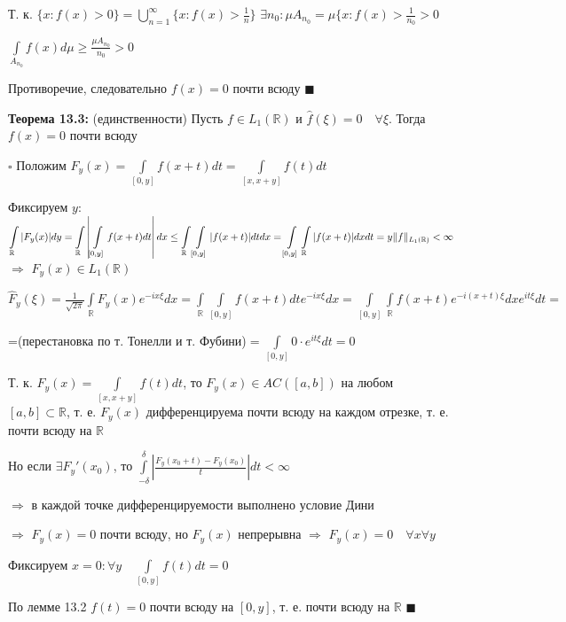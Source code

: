 \documentclass[a4paper]{report}
\newcommand*{\hm}[1]{#1\nobreak\discretionary{}%
            {\hbox{$\mathsurround=0pt #1$}}{}}
\begin{document}
Т. к. $\{x\colon f(x)>0\}=\bigcup\limits_{n=1}^\infty\{x\colon f(x)>\frac1n\}$ $\exists n_0\colon\mu A_{n_0}=\mu\{x\colon f(x)>\displaystyle\frac{1}{n_0}>0$

$\displaystyle\int\limits_{A_{n_0}}f(x)d\mu\ge\frac{\mu A_{n_0}}{n_0}>0$

Противоречие, следовательно $f(x)=0$ почти всюду $\blacksquare$
\bigskip

\noindent\textbf{Теорема 13.3:} (единственности) Пусть $f\in L_1(\mathbb R)$ и $\hat f(\xi)=0\quad\forall\xi$. Тогда $f(x)=0$ почти всюду

\noindent $\square$ Положим $F_y(x)=\displaystyle\int\limits_{[0,y]}f(x+t)dt=\displaystyle\int\limits_{[x,x+y]}f(t)dt$

Фиксируем $y$: $\displaystyle\int\limits_{\mathbb R}|F_y(x)|dy=\displaystyle\int\limits_{\mathbb R}\left|\displaystyle\int\limits_{[0,y]}f(x+t)dt\right|dx\le\displaystyle\int\limits_{\mathbb R}\displaystyle\int\limits_{[0,y]}|f(x+t)|dtdx\hm=\displaystyle\int\limits_{[0,y]}\displaystyle\int\limits_{\mathbb R}|f(x+t)|dxdt=y\|f\|_{L_1(\mathbb R)}<\infty$ $\Rightarrow$ $F_y(x)\in L_1(\mathbb R)$

$\hat F_y(\xi)=\displaystyle\frac{1}{\sqrt{2\pi}}\displaystyle\int\limits_{\mathbb R}F_y(x)e^{-ix\xi}dx=\displaystyle\int\limits_{\mathbb R}\displaystyle\int\limits_{[0,y]}f(x+t)dt e^{-ix\xi}dx=\displaystyle\int\limits_{[0,y]}\displaystyle\int\limits_{\mathbb R}f(x+t)e^{-i(x+t)\xi}dx e^{it\xi}dt=$

\noindent =(перестановка по т. Тонелли и т. Фубини)$=\displaystyle\int\limits_{[0,y]}0\cdot e^{it\xi}dt=0$

Т. к. $F_y(x)=\displaystyle\int\limits_{[x,x+y]}f(t)dt$, то $F_y(x)\in AC([a,b])$ на любом $[a,b]\subset \mathbb R$, т. е. $F_y(x)$ дифференцируема почти всюду на каждом отрезке, т. е. почти всюду на $\mathbb R$

Но если $\exists F_y'(x_0)$, то $\displaystyle\int\limits_{-\delta}^\delta\left|\frac{F_y(x_0+t)-F_y(x_0)}{t}\right|dt<\infty$

$\Rightarrow$ в каждой точке дифференцируемости выполнено условие Дини

$\Rightarrow$ $F_y(x)=0$ почти всюду, но $F_y(x)$ непрерывна $\Rightarrow$ $F_y(x)=0\quad\forall x\forall y$

Фиксируем $x=0\colon\forall y\quad\displaystyle\int\limits_{[0,y]}f(t)dt=0$

По лемме 13.2 $f(t)=0$ почти всюду на $[0,y]$, т. е. почти всюду на $\mathbb R$ $\blacksquare$
\bigskip
\end{document}
